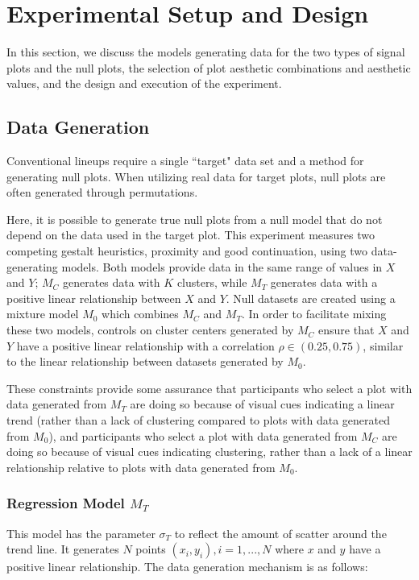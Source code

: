 \documentclass[12pt]{article}\usepackage[]{graphicx}\usepackage[]{color}
\begin{document}
\section{Experimental Setup and Design} \label{sec:ExperimentalDesign}
In this section, we discuss the models generating data for the two types of signal plots and the null plots, the selection of plot aesthetic combinations and aesthetic values, and the design and execution of the experiment.

\subsection{Data Generation}
Conventional lineups require a single ``target" data set and a method for generating null plots. 
When utilizing real data for target plots, null plots are often generated through permutations.

Here, it is possible to generate true null plots from a null model that do not depend on the data used in the target plot. 
This experiment measures two competing gestalt heuristics, proximity and good continuation, using two data-generating models. 
Both models provide data in the same range of values in $X$ and $Y$;  $M_C$ generates data  with $K$ clusters, while $M_T$ generates data with a positive linear relationship between $X$ and $Y$. 
Null datasets are created using a mixture model $M_0$ which combines $M_C$ and $M_T$. 
In order to facilitate mixing these two models, controls on cluster centers generated by $M_C$ ensure that $X$ and $Y$ have a positive linear relationship with a correlation $\rho \in (0.25, 0.75)$, similar to the linear relationship between datasets generated by $M_0$. 

These constraints provide some assurance that participants who select a plot with data generated from $M_T$ are doing so because of visual cues indicating a linear trend (rather than a lack of clustering compared to plots with data generated from $M_0$), and participants who select a plot with data generated from $M_C$ are doing so because of visual cues indicating clustering, rather than a lack of a linear relationship relative to plots with data generated from $M_0$. 

\subsubsection{Regression Model \texorpdfstring{$M_T$}{Mt}}
This model has the parameter $\sigma_T$ to reflect the amount of scatter around the trend line. It generates $N$ points $(x_i, y_i), i=1, ..., N$ where $x$ and $y$ have a positive linear relationship. The data generation mechanism is as follows: 
\end{document}
